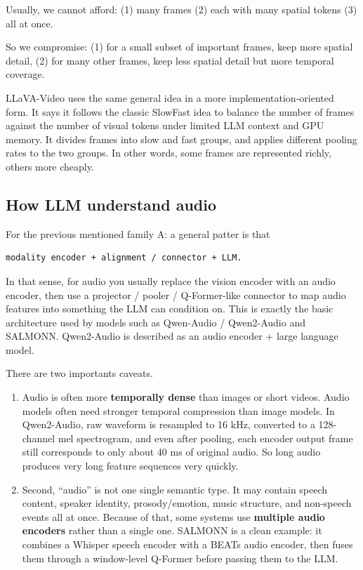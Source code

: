 \documentclass[11pt]{article}  %
\begin{document}
Usually, we cannot afford: (1) many frames (2) each with many spatial tokens (3) all at once.

So we compromise: (1) for a small subset of important frames, keep more spatial detail, (2) for many other frames, keep less spatial detail but more temporal coverage.

LLaVA-Video uses the same general idea in a more implementation-oriented form. 
It says it follows the classic SlowFast idea to balance the number of frames against the number of visual tokens under limited LLM context and GPU memory. 
It divides frames into slow and fast groups, and applies different pooling rates to the two groups. 
In other words, some frames are represented richly, others more cheaply.


\subsection{How LLM understand audio}
For the previous mentioned family A: a general patter is that 
\begin{verbatim}
modality encoder + alignment / connector + LLM.
\end{verbatim}
In that sense, for audio you usually replace the vision encoder with an audio encoder, then use a projector / pooler / Q-Former-like connector to map audio features into something the LLM can condition on.
This is exactly the basic architecture used by models such as Qwen-Audio / Qwen2-Audio and SALMONN. Qwen2-Audio is described as an audio encoder + large language model.

There are two importants caveats.
\begin{enumerate}
  \item Audio is often more \textbf{temporally dense} than images or short videos. 
  Audio models often need stronger temporal compression than image models.
  In Qwen2-Audio, raw waveform is resampled to 16 kHz, converted to a 128-channel mel spectrogram, and even after pooling, each encoder output frame still corresponds to only about 40 ms of original audio. So long audio produces very long feature sequences very quickly.

  \item Second, ``audio'' is not one single semantic type.
  It may contain speech content, speaker identity, prosody/emotion, music structure, and non-speech events all at once.
  Because of that, some systems use \textbf{multiple audio encoders} rather than a single one. 
  SALMONN is a clean example: it combines a Whisper speech encoder with a BEATs audio encoder, then fuses them through a window-level Q-Former before passing them to the LLM.
\end{enumerate}
\end{document}
